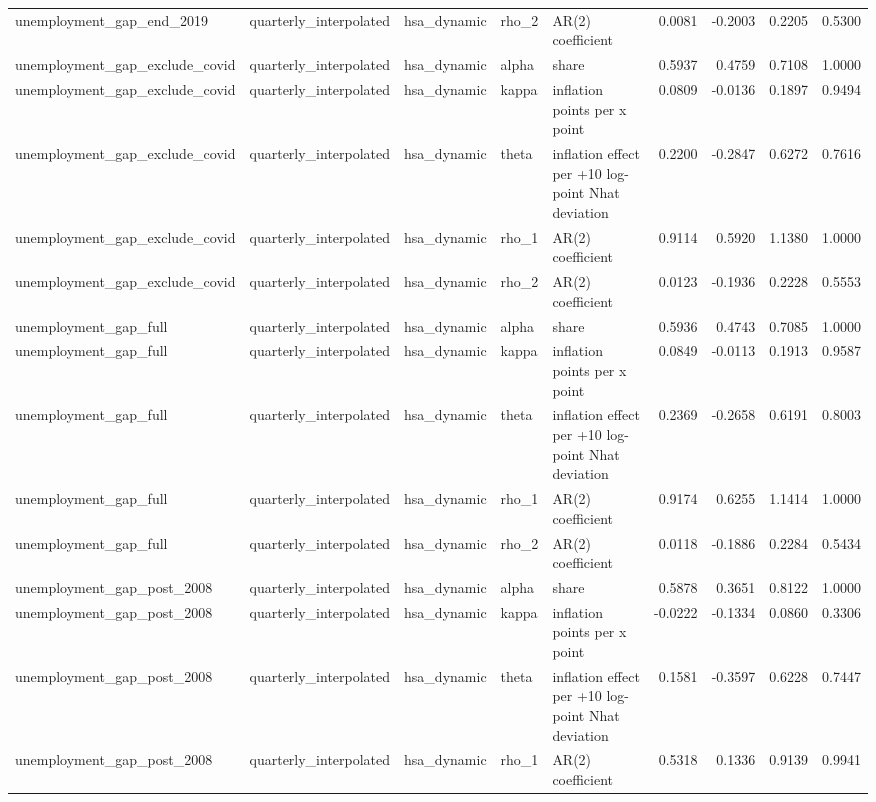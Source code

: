 \begin{tabular}{lllllrrrr}
unemployment\_gap\_end\_2019 & quarterly\_interpolated & hsa\_dynamic & rho\_2 & AR(2) coefficient & 0.0081 & -0.2003 & 0.2205 & 0.5300 \\
unemployment\_gap\_exclude\_covid & quarterly\_interpolated & hsa\_dynamic & alpha & share & 0.5937 & 0.4759 & 0.7108 & 1.0000 \\
unemployment\_gap\_exclude\_covid & quarterly\_interpolated & hsa\_dynamic & kappa & inflation points per x point & 0.0809 & -0.0136 & 0.1897 & 0.9494 \\
unemployment\_gap\_exclude\_covid & quarterly\_interpolated & hsa\_dynamic & theta & inflation effect per +10 log-point Nhat deviation & 0.2200 & -0.2847 & 0.6272 & 0.7616 \\
unemployment\_gap\_exclude\_covid & quarterly\_interpolated & hsa\_dynamic & rho\_1 & AR(2) coefficient & 0.9114 & 0.5920 & 1.1380 & 1.0000 \\
unemployment\_gap\_exclude\_covid & quarterly\_interpolated & hsa\_dynamic & rho\_2 & AR(2) coefficient & 0.0123 & -0.1936 & 0.2228 & 0.5553 \\
unemployment\_gap\_full & quarterly\_interpolated & hsa\_dynamic & alpha & share & 0.5936 & 0.4743 & 0.7085 & 1.0000 \\
unemployment\_gap\_full & quarterly\_interpolated & hsa\_dynamic & kappa & inflation points per x point & 0.0849 & -0.0113 & 0.1913 & 0.9587 \\
unemployment\_gap\_full & quarterly\_interpolated & hsa\_dynamic & theta & inflation effect per +10 log-point Nhat deviation & 0.2369 & -0.2658 & 0.6191 & 0.8003 \\
unemployment\_gap\_full & quarterly\_interpolated & hsa\_dynamic & rho\_1 & AR(2) coefficient & 0.9174 & 0.6255 & 1.1414 & 1.0000 \\
unemployment\_gap\_full & quarterly\_interpolated & hsa\_dynamic & rho\_2 & AR(2) coefficient & 0.0118 & -0.1886 & 0.2284 & 0.5434 \\
unemployment\_gap\_post\_2008 & quarterly\_interpolated & hsa\_dynamic & alpha & share & 0.5878 & 0.3651 & 0.8122 & 1.0000 \\
unemployment\_gap\_post\_2008 & quarterly\_interpolated & hsa\_dynamic & kappa & inflation points per x point & -0.0222 & -0.1334 & 0.0860 & 0.3306 \\
unemployment\_gap\_post\_2008 & quarterly\_interpolated & hsa\_dynamic & theta & inflation effect per +10 log-point Nhat deviation & 0.1581 & -0.3597 & 0.6228 & 0.7447 \\
unemployment\_gap\_post\_2008 & quarterly\_interpolated & hsa\_dynamic & rho\_1 & AR(2) coefficient & 0.5318 & 0.1336 & 0.9139 & 0.9941 \\

\end{tabular}
